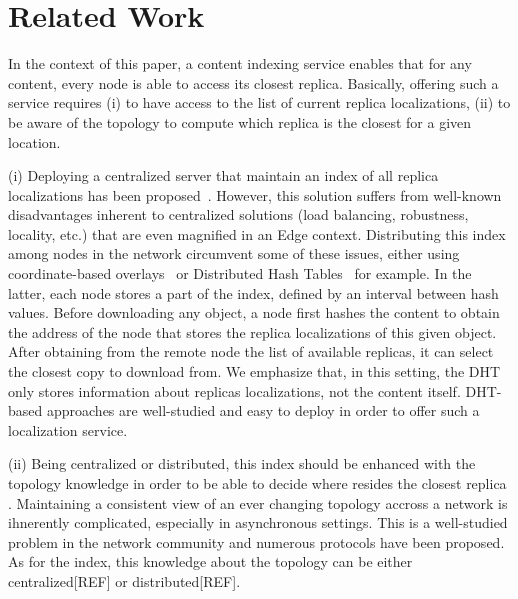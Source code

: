 \section{Related Work}
\label{related_work}


In the context of this paper, a content indexing service enables that for any content, every node is able to access its closest replica.
Basically, offering such a service requires (i) to have access to the list of current replica localizations, (ii) to be aware of the topology to compute which replica is the closest for a given location. 

(i) Deploying a centralized server that maintain an index of all replica localizations has been proposed~\cite{fogstore, p2p-alto, p2p-oracle, snamp}. However, this solution suffers from well-known disadvantages inherent to centralized solutions (load balancing, robustness, locality, etc.) that are even magnified in an Edge context.
Distributing this index among nodes in the network circumvent some of these issues, either using coordinate-based overlays~\cite{coin_19, voronet} or Distributed Hash Tables~\cite{squirrel, ipfs, dht-name-resolution, mdht} for example. In the latter, each node stores a part of the index, defined by an interval between hash values. 
Before downloading any object, a node first
hashes the content to obtain the address of the node that stores the replica localizations of this given object. After obtaining from the remote node the list of available replicas, it can select the closest copy to download from. We emphasize that, in this setting, the DHT only stores information about replicas localizations, not the content itself. DHT-based approaches are well-studied and easy to deploy in order to offer such a localization service. 

(ii) Being centralized or distributed, this index should be enhanced with the topology knowledge in order to be able to decide where resides the closest replica . Maintaining a consistent view of an ever changing topology accross a network is ihnerently complicated, especially in asynchronous settings. This is a well-studied problem in the network community and numerous protocols have been proposed. As for the index, this knowledge about the topology can be either centralized[REF] or distributed[REF].


